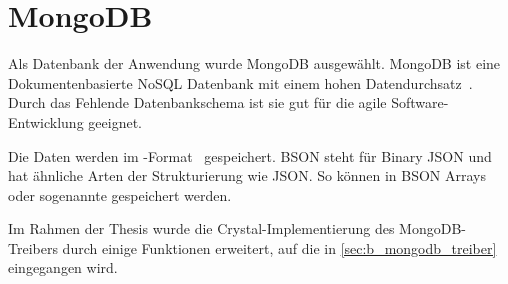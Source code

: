\section{MongoDB}
\label{sec:g_mongodb}

Als Datenbank der Anwendung wurde MongoDB ausgewählt.  MongoDB ist eine
Dokumentenbasierte NoSQL Datenbank mit einem hohen Datendurchsatz~\cite{mongo}.
Durch das Fehlende Datenbankschema ist sie gut für die agile
Software-Entwicklung geeignet.

Die Daten werden im -Format~\cite{bson} gespeichert.  BSON steht
für Binary JSON und hat ähnliche Arten der Strukturierung wie JSON.  So können
in BSON Arrays oder sogenannte  gespeichert werden.

Im Rahmen der Thesis wurde die Crystal-Implementierung des MongoDB-Treibers
durch einige Funktionen erweitert, auf die in \cref{sec:b_mongodb_treiber}
eingegangen wird.
